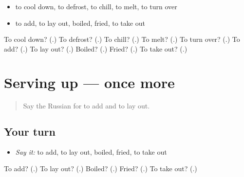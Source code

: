 \begin{itemize}
\raggedright
  \item to cool down, to defrost, to chill, to melt, to turn over
  \item to add, to lay out, boiled, fried, to take out
\end{itemize}

\begin{tcolorbox}[breakable,colback=teal!4,colframe=teal!35!black,title={Before you move on}]
To cool down? (\textbf{}.) To defrost? (\textbf{}.) To chill? (\textbf{}.) To melt? (\textbf{}.) To turn over? (\textbf{}.) To add? (\textbf{}.) To lay out? (\textbf{}.) Boiled? (\textbf{}.) Fried? (\textbf{}.) To take out? (\textbf{}.)
\end{tcolorbox}
\section[(dialogue)]{Serving up — once more}

\label{lesson:RU-R336-review-final-336}



\begin{quote}
Say the Russian for to add and to lay out.
\end{quote}

\subsection*{Your turn}
\begin{itemize}
\raggedright
  \item \emph{Say it:} to add, to lay out, boiled, fried, to take out
\end{itemize}

\begin{tcolorbox}[breakable,colback=teal!4,colframe=teal!35!black,title={Before you move on}]
To add? (\textbf{}.) To lay out? (\textbf{}.) Boiled? (\textbf{}.) Fried? (\textbf{}.) To take out? (\textbf{}.)
\end{tcolorbox}
